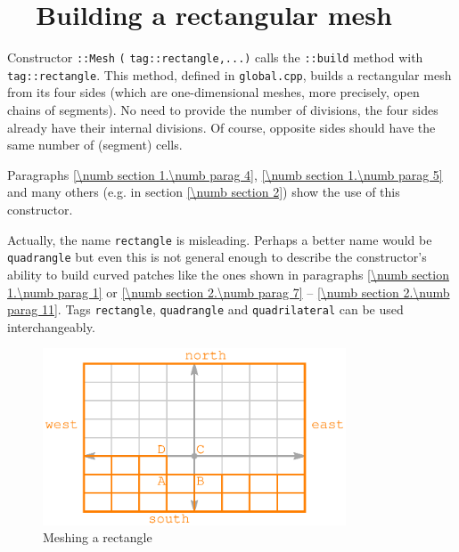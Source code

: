\section{~~Building a rectangular mesh}\label{\numb section 12.\numb parag 3}

Constructor {\small\tt {}::Mesh} {\small\tt(} {\small\tt\textcolor{tag}{tag}::rectangle,...)}
calls the {\small\tt{}::build} method with {\small\tt \textcolor{tag}{tag}::rectangle}.
This method, defined in {\small\tt global.cpp}, builds a rectangular mesh from its
four sides (which are one-dimensional meshes, more precisely, open chains of segments).
No need to provide the number of divisions, the four sides already have their internal divisions.
Of course, opposite sides should have the same number of (segment) cells.

Paragraphs \ref{\numb section 1.\numb parag 4}, \ref{\numb section 1.\numb parag 5} and
many others (e.g. in section \ref{\numb section 2}) show the use of this constructor.

Actually, the name {\small\tt rectangle} is misleading.
Perhaps a better name would be {\small\tt quadrangle} but even this is not general enough to
describe the constructor's ability to build curved patches like the ones shown in paragraphs
\ref{\numb section 1.\numb parag 1} or \ref{\numb section 2.\numb parag 7} --
\ref{\numb section 2.\numb parag 11}.
Tags {\small\tt rectangle}, {\small\tt quadrangle} and {\small\tt quadrilateral} can be used
interchangeably.

\begin{figure}[ht] \centering
  \includegraphics[width=90mm]{fig-rectangle}
  \caption{Meshing a rectangle}
  \label{\numb section 12.\numb fig 1}
\end{figure}

